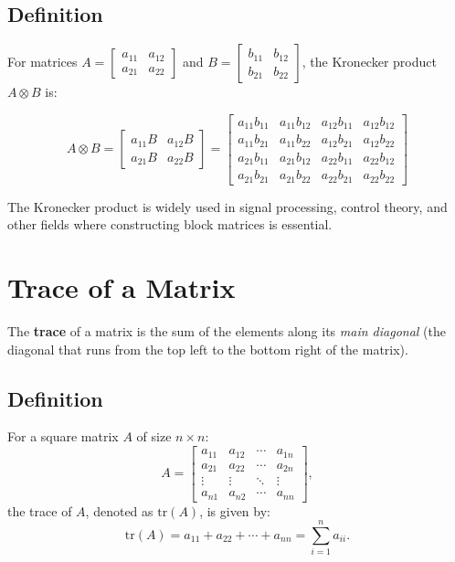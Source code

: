 \documentclass{article}
\begin{document}
\subsection*{Definition}
For matrices \( A = \begin{bmatrix} a_{11} & a_{12} \\ a_{21} & a_{22} \end{bmatrix} \) and \( B = \begin{bmatrix} b_{11} & b_{12} \\ b_{21} & b_{22} \end{bmatrix} \), the Kronecker product \( A \otimes B \) is:

\[
A \otimes B = \begin{bmatrix} a_{11}B & a_{12}B \\ a_{21}B & a_{22}B \end{bmatrix} = \begin{bmatrix} a_{11}b_{11} & a_{11}b_{12} & a_{12}b_{11} & a_{12}b_{12} \\ a_{11}b_{21} & a_{11}b_{22} & a_{12}b_{21} & a_{12}b_{22} \\ a_{21}b_{11} & a_{21}b_{12} & a_{22}b_{11} & a_{22}b_{12} \\ a_{21}b_{21} & a_{21}b_{22} & a_{22}b_{21} & a_{22}b_{22} \end{bmatrix}
\]

The Kronecker product is widely used in signal processing, control theory, and other fields where constructing block matrices is essential.

\section{Trace of a Matrix}

The \textbf{trace} of a matrix is the sum of the elements along its \textit{main diagonal} (the diagonal that runs from the top left to the bottom right of the matrix).

\subsection*{Definition}

For a square matrix \( A \) of size \( n \times n \):
\[
A = \begin{bmatrix} a_{11} & a_{12} & \cdots & a_{1n} \\ a_{21} & a_{22} & \cdots & a_{2n} \\ \vdots & \vdots & \ddots & \vdots \\ a_{n1} & a_{n2} & \cdots & a_{nn} \end{bmatrix},
\]
the trace of \( A \), denoted as \( \text{tr}(A) \), is given by:
\[
\text{tr}(A) = a_{11} + a_{22} + \cdots + a_{nn} = \sum_{i=1}^n a_{ii}.
\]
\end{document}
